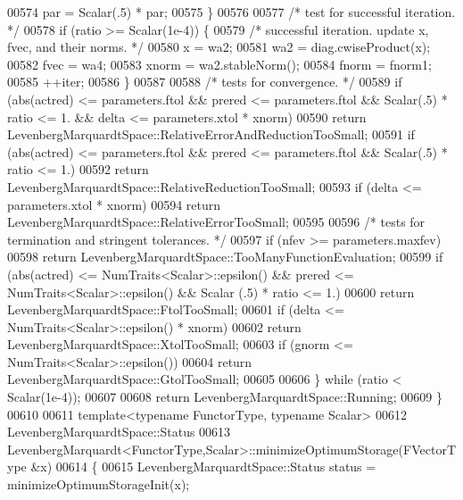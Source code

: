 \begin{DoxyCode}
00574             par = Scalar(.5) * par;
00575         \}
00576 
00577         \textcolor{comment}{/* test for successful iteration. */}
00578         \textcolor{keywordflow}{if} (ratio >= Scalar(1e-4)) \{
00579             \textcolor{comment}{/* successful iteration. update x, fvec, and their norms. */}
00580             x = wa2;
00581             wa2 = diag.cwiseProduct(x);
00582             fvec = wa4;
00583             xnorm = wa2.stableNorm();
00584             fnorm = fnorm1;
00585             ++iter;
00586         \}
00587 
00588         \textcolor{comment}{/* tests for convergence. */}
00589         \textcolor{keywordflow}{if} (abs(actred) <= parameters.ftol && prered <= parameters.ftol && Scalar(.5) * ratio <= 1. && 
      delta <= parameters.xtol * xnorm)
00590             \textcolor{keywordflow}{return} LevenbergMarquardtSpace::RelativeErrorAndReductionTooSmall;
00591         \textcolor{keywordflow}{if} (abs(actred) <= parameters.ftol && prered <= parameters.ftol && Scalar(.5) * ratio <= 1.)
00592             \textcolor{keywordflow}{return} LevenbergMarquardtSpace::RelativeReductionTooSmall;
00593         \textcolor{keywordflow}{if} (delta <= parameters.xtol * xnorm)
00594             \textcolor{keywordflow}{return} LevenbergMarquardtSpace::RelativeErrorTooSmall;
00595 
00596         \textcolor{comment}{/* tests for termination and stringent tolerances. */}
00597         \textcolor{keywordflow}{if} (nfev >= parameters.maxfev)
00598             \textcolor{keywordflow}{return} LevenbergMarquardtSpace::TooManyFunctionEvaluation;
00599         \textcolor{keywordflow}{if} (abs(actred) <= NumTraits<Scalar>::epsilon() && prered <= NumTraits<Scalar>::epsilon() && Scalar
      (.5) * ratio <= 1.)
00600             \textcolor{keywordflow}{return} LevenbergMarquardtSpace::FtolTooSmall;
00601         \textcolor{keywordflow}{if} (delta <= NumTraits<Scalar>::epsilon() * xnorm)
00602             \textcolor{keywordflow}{return} LevenbergMarquardtSpace::XtolTooSmall;
00603         \textcolor{keywordflow}{if} (gnorm <= NumTraits<Scalar>::epsilon())
00604             \textcolor{keywordflow}{return} LevenbergMarquardtSpace::GtolTooSmall;
00605 
00606     \} \textcolor{keywordflow}{while} (ratio < Scalar(1e-4));
00607 
00608     \textcolor{keywordflow}{return} LevenbergMarquardtSpace::Running;
00609 \}
00610 
00611 \textcolor{keyword}{template}<\textcolor{keyword}{typename} FunctorType, \textcolor{keyword}{typename} Scalar>
00612 LevenbergMarquardtSpace::Status
00613 LevenbergMarquardt<FunctorType,Scalar>::minimizeOptimumStorage(FVectorType  &x)
00614 \{
00615     LevenbergMarquardtSpace::Status status = minimizeOptimumStorageInit(x);

\end{DoxyCode}
